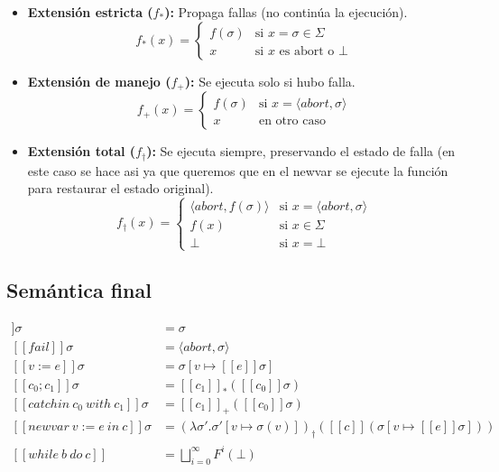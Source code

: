 \documentclass[a4paper,11pt]{article}
\begin{document}
\begin{itemize}
    \item \textbf{Extensión estricta ($f_*$):} Propaga fallas (no continúa la ejecución).
    \[
    f_*(x) =
    \begin{cases}
    f(\sigma) & \text{si } x = \sigma \in \Sigma \\
    x & \text{si } x \text{ es abort o } \bot
    \end{cases}
    \]

    \item \textbf{Extensión de manejo ($f_+$):} Se ejecuta solo si hubo falla.
    \[
    f_+(x) =
    \begin{cases}
    f(\sigma) & \text{si } x = \langle abort, \sigma \rangle \\
    x & \text{en otro caso}
    \end{cases}
    \]

    \item \textbf{Extensión total ($f_\dagger$):} Se ejecuta siempre, preservando el estado de falla (en este caso se hace asi ya que queremos que en el newvar se ejecute la función para restaurar el estado original).
    \[
    f_\dagger(x) =
    \begin{cases}
    \langle abort, f(\sigma) \rangle & \text{si } x = \langle abort, \sigma \rangle \\
    f(x) & \text{si } x \in \Sigma \\
    \bot & \text{si } x = \bot
    \end{cases}
    \]
\end{itemize}

\subsection{Semántica final}
\begin{align*}
[[skip]]\sigma &= \sigma \\
[[fail]]\sigma &= \langle abort, \sigma \rangle \\
[[v := e]]\sigma &= \sigma[v \mapsto [[e]]\sigma] \\
[[c_0; c_1]]\sigma &= [[c_1]]_*([[c_0]]\sigma) \\
[[catchin \ c_0 \ with \ c_1]]\sigma &= [[c_1]]_+([[c_0]]\sigma) \\
[[newvar \ v := e \ in \ c]]\sigma &=
(\lambda \sigma'. \sigma'[v \mapsto \sigma(v)])_\dagger
([[c]](\sigma[v \mapsto [[e]]\sigma])) \\
[[while \ b \ do \ c]] &= \bigsqcup_{i=0}^{\infty} F^i(\bot)
\end{align*}
\end{document}

